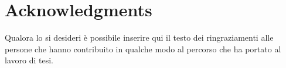 \chapter*{Acknowledgments}

Qualora lo si desideri è possibile inserire qui il testo dei ringraziamenti alle persone che hanno contribuito in qualche modo al percorso che ha portato al lavoro di tesi.